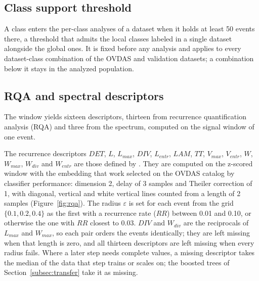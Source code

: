 \documentclass[pdflatex,sn-mathphys-num]{sn-jnl}
\begin{document}
\subsection{Class support threshold}\label{subsec:classsupport}

A class enters the per-class analyses of a dataset when it holds at least 50
events there, a threshold that admits the local classes labeled in a single
dataset alongside the global ones. It is fixed before any analysis and
applies to every dataset-class combination of the OVDAS and validation
datasets; a combination below it stays in the analyzed population.

\subsection{RQA and spectral descriptors}\label{subsec:features}

The window yields sixteen descriptors, thirteen from recurrence
quantification analysis (RQA) and three from the spectrum, computed on the
signal window of one event.

The recurrence descriptors $DET$, $L$, $L_{max}$, $DIV$, $L_{entr}$, $LAM$,
$TT$, $V_{max}$, $V_{entr}$, $W$, $W_{max}$, $W_{div}$ and $W_{entr}$
\cite{marwan_recurrence_2007} are those defined by
\cite{morales_recurrence_2026}. They are computed on the z-scored window
with the embedding that work selected on the OVDAS catalog by classifier
performance: dimension 2, delay of 3 samples and Theiler correction of 1,
with diagonal, vertical and white vertical lines counted from a length of 2
samples (Figure~\ref{fig:rqa}). The radius $\varepsilon$ is set for each event from
the grid $\{0.1, 0.2, 0.4\}$ as the first with a recurrence rate ($RR$)
between 0.01 and 0.10, or otherwise the one with $RR$ closest to 0.03. $DIV$
and $W_{div}$ are the reciprocals of $L_{max}$ and $W_{max}$, so each pair
orders the events identically; they are left missing when that length is
zero, and all thirteen descriptors are left missing when every radius fails.
Where a later step needs complete values, a missing descriptor takes the
median of the data that step trains or scales on; the boosted trees of
Section~\ref{subsec:transfer} take it as missing.
\end{document}
